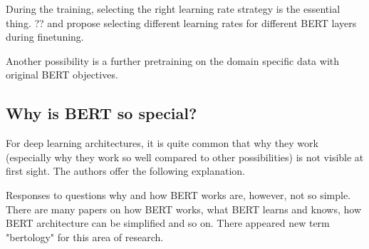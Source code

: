  

 
 During the training, selecting the right learning rate strategy is the essential thing. \citep{Ruder2018}?? and \citep{Sun} propose selecting different learning rates for different BERT layers during finetuning. 
 
 Another possibility is a further pretraining on the domain specific data \citep{Sun} with original BERT objectives.
 

 \subsection{Why is BERT so special?}
 \label{sub:specialBert}
For deep learning architectures, it is quite common that why they work (especially why they work so well compared to other possibilities) is not visible at first sight. The authors offer the following explanation. 
\par
Responses to questions why and how BERT works are, however, not so simple. There are many papers on how BERT works, what BERT learns and knows, how BERT architecture can be simplified and so on. There appeared new term "bertology" for this area of research.







